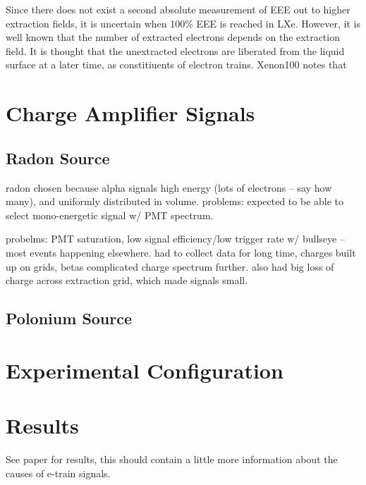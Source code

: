 Since there does not exist a second absolute measurement of \ac{EEE} out to higher extraction fields, it is uncertain when 100\% \ac{EEE} is reached in \ac{LXe}. However, it is well known that the number of extracted electrons depends on the extraction field. It is thought that the unextracted electrons are liberated from the liquid surface at a later time, as constitiuents of electron trains. Xenon100 notes that 

\section{Charge Amplifier Signals}

\subsection{Radon Source}
 radon chosen because alpha signals high energy (lots of electrons -- say how many), and uniformly distributed in volume. problems: expected to be able to select mono-energetic signal w/ PMT spectrum. 
 
 probelms: PMT saturation, low signal efficiency/low trigger rate w/ bullseye -- most events happening elsewhere. had to collect data for long time, charges built up on grids, betas complicated charge spectrum further. also had big loss of charge across extraction grid, which made signals small. 
 
\subsection{Polonium Source}

\section{Experimental Configuration}

\section{Results}
See paper for results, this should contain a little more information about the causes of e-train signals. 

